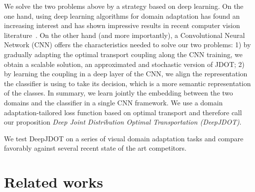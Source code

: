 \documentclass[runningheads]{llncs}
\begin{document}
We solve the two problems above by a strategy based on deep learning. On the one hand, using deep learning algorithms for domain adaptation has found an increasing interest and has shown impressive results in recent computer vision literature~\cite{deepcoral,LEL,Ganin2016,CoGAN}. On the other hand (and more importantly), a Convolutional Neural Network (CNN) offers the characteristics needed to solve our two problems:  1) by gradually adapting the optimal transport coupling along the CNN training, we obtain a scalable solution, an approximated and stochastic version of JDOT; 2) by learning the coupling in a deep layer of the CNN, we align the representation the classifier is using to take its decision, which is a more semantic representation of the classes. In summary, we learn jointly the embedding between the two domains and the classifier in a single CNN framework. We use a domain adaptation-tailored loss function based on optimal transport and therefore call our proposition \emph{Deep Joint Distribution Optimal Transportation (DeepJDOT)}.

We test DeepJDOT on a series of visual domain adaptation tasks and compare favorably against several recent state of the art competitors.


\section{Related works}
\label{sec:rw}
\end{document}
